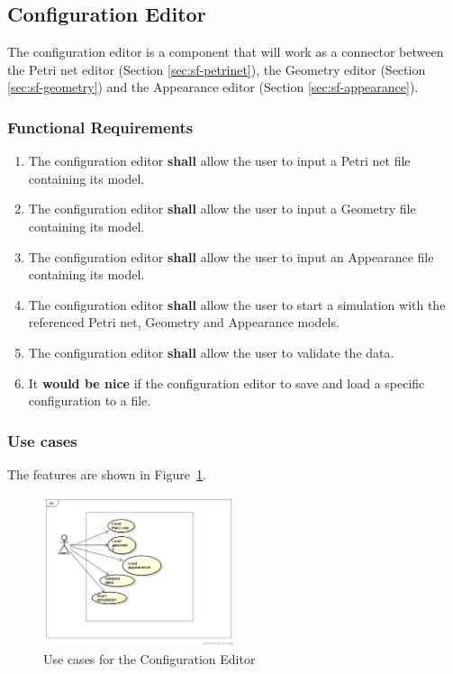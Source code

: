 \subsection{Configuration Editor}

The configuration editor is a component that will work as a connector between the Petri net editor (Section \ref{sec:sf-petrinet}), the Geometry editor (Section \ref{sec:sf-geometry}) and the Appearance editor (Section \ref{sec:sf-appearance}). 

\subsubsection{Functional Requirements}

\begin{enumerate}
	\item The configuration editor \textbf{shall} allow the user to input a Petri net file containing its model.
	\item The configuration editor \textbf{shall} allow the user to input a Geometry file containing its model.
	\item The configuration editor \textbf{shall} allow the user to input an Appearance file containing its model.
	\item The configuration editor \textbf{shall} allow the user to start a simulation with the referenced Petri net, Geometry and Appearance models.
	\item The configuration editor \textbf{shall} allow the user to validate the data.
	\item It \textbf{would be nice} if the configuration editor to save and load a specific configuration to a file.
\end{enumerate}

\subsubsection{Use cases}

The features are shown in Figure~\ref{fig:use-cases-configuration}.

\begin{figure}[htp]
\begin{center}
  \includegraphics[width=0.5\textwidth]{image/uc-configuration.png}
  \caption{Use cases for the Configuration Editor}
  \label{fig:use-cases-configuration}
\end{center}
\end{figure}